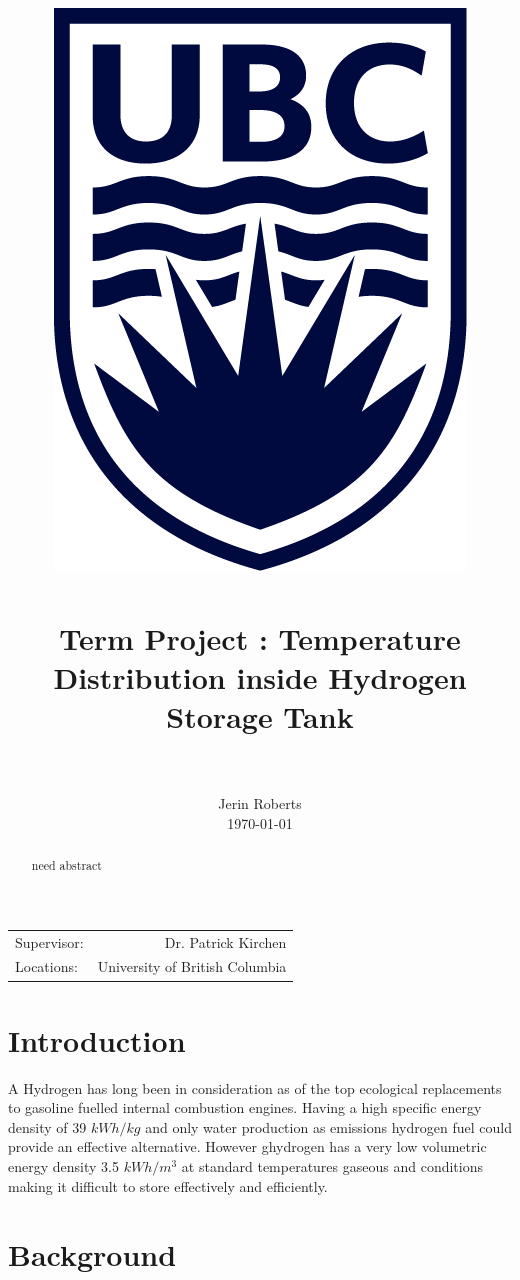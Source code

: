 \documentclass[paper=a4, fontsize=11pt, abstract=on]{scrartcl}
\title{
		\usefont{OT1}{bch}{b}{n}
		\normalfont \normalsize \textsc{} \\ [25pt]
		\includegraphics[width=0.2\linewidth]{ubc.png} \\
		\horrule{0.5pt} \\[0.2cm]
		\huge Term Project : Temperature Distribution inside Hydrogen Storage Tank \\
		\horrule{2pt} \\[0.005cm]
}
\author{
		\normalfont 								\normalsize
        Jerin Roberts\\[-5pt]		\normalsize
        \today
}
\date{}
\numberwithin{equation}{section}		%
\numberwithin{figure}{section}			%
\numberwithin{table}{section}				%
\begin{document}
\maketitle
\begin{center}
\begin{tabular}{l r}


Supervisor: & Dr. Patrick Kirchen  \\ %
Locations: & University of British Columbia


\end{tabular}
\end{center}
\newpage
\begin{abstract}
  need abstract
\end{abstract}


\newpage
\tableofcontents
\listoffigures
\listoftables
\newpage
\lstset{language=[Visual]C++}

\mbox{}%

 
 
\printnomenclature

\newpage
\section{Introduction}


A Hydrogen has long been in consideration as of the top ecological replacements to gasoline fuelled internal combustion engines. Having a high specific energy density of 39 $kWh/kg$ and only water production as emissions hydrogen fuel could provide an effective alternative. However ghydrogen has a very low volumetric energy density 3.5 $kWh/m^3$ at standard temperatures gaseous and conditions making it difficult to store effectively and efficiently. 


\section{Background}
\end{document}
